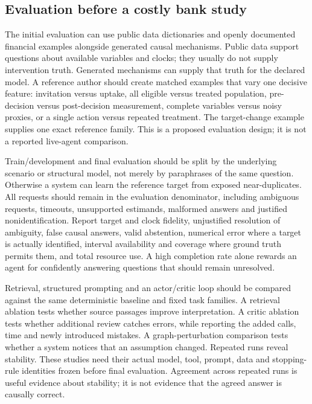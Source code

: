 \hypertarget{evaluation-before-a-costly-bank-study}{%
\subsection{Evaluation before a costly bank
study}\label{evaluation-before-a-costly-bank-study}}

The initial evaluation can use public data dictionaries and openly
documented financial examples alongside generated causal mechanisms.
Public data support questions about available variables and clocks; they
usually do not supply intervention truth. Generated mechanisms can
supply that truth for the declared model. A reference author should
create matched examples that vary one decisive feature: invitation
versus uptake, all eligible versus treated population, pre-decision
versus post-decision measurement, complete variables versus noisy
proxies, or a single action versus repeated treatment. The target-change
example supplies one exact reference family. This is a proposed
evaluation design; it is not a reported live-agent comparison.

Train/development and final evaluation should be split by the underlying
scenario or structural model, not merely by paraphrases of the same
question. Otherwise a system can learn the reference target from exposed
near-duplicates. All requests should remain in the evaluation
denominator, including ambiguous requests, timeouts, unsupported
estimands, malformed answers and justified nonidentification. Report
target and clock fidelity, unjustified resolution of ambiguity, false
causal answers, valid abstention, numerical error where a target is
actually identified, interval availability and coverage where ground
truth permits them, and total resource use. A high completion rate alone
rewards an agent for confidently answering questions that should remain
unresolved.

Retrieval, structured prompting and an actor/critic loop should be
compared against the same deterministic baseline and fixed task
families. A retrieval ablation tests whether source passages improve
interpretation. A critic ablation tests whether additional review
catches errors, while reporting the added calls, time and newly
introduced mistakes. A graph-perturbation comparison tests whether a
system notices that an assumption changed. Repeated runs reveal
stability. These studies need their actual model, tool, prompt, data and
stopping-rule identities frozen before final evaluation. Agreement
across repeated runs is useful evidence about stability; it is not
evidence that the agreed answer is causally correct.

